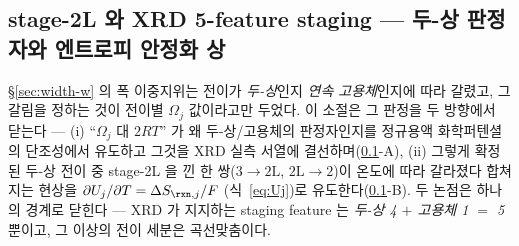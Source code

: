 \subsection{stage-2L 와 XRD 5-feature staging --- 두-상 판정자와 엔트로피 안정화 상}\label{ssec:gr-stage2l}
\S\ref{sec:width-w} 의 폭 이중지위는 전이가 \emph{두-상}인지 \emph{연속 고용체}인지에 따라 갈렸고, 그 갈림을
정하는 것이 전이별 $\Omega_j$ 값이라고만 두었다. 이 소절은 그 판정을 두 방향에서 닫는다 --- (i) ``$\Omega_j$ 대
$2RT$'' 가 왜 두-상/고용체의 판정자인지를 정규용액 화학퍼텐셜의 단조성에서 유도하고 그것을 XRD 실측 서열에
결선하며(\ref{ssec:gr-stage2l}-A), (ii) 그렇게 확정된 두-상 전이 중 stage-2L 을 낀 한 쌍($3\!\to\!2\mathrm L$,
$2\mathrm L\!\to\!2$)이 온도에 따라 갈라졌다 합쳐지는 현상을 $\partial U_j/\partial T=\Delta S_{\rxn,j}/F$
(식~\eqref{eq:Uj})로 유도한다(\ref{ssec:gr-stage2l}-B). 두 논점은 하나의 경계로 닫힌다 --- XRD 가 지지하는
staging feature 는 \emph{두-상 4 $+$ 고용체 1 $=$ 5} 뿐이고, 그 이상의 전이 세분은 곡선맞춤이다.

